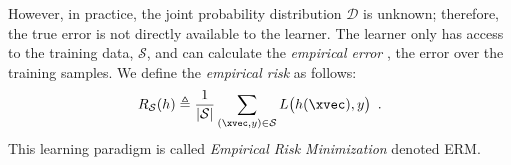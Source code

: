 However, in practice, the joint probability distribution $\mathcal{D}$ is unknown; therefore, the true error is not directly available to the learner.
The learner only has access to the training data, $\mathcal{S}$, and can calculate the \emph{empirical error} \ie, the error over the training samples.
We define the \emph{empirical risk} as follows:
\begin{equation} \label{equation:ch2-empirical_risk}
  R_{\mathcal{S}}(h) \triangleq \frac{1}{|\mathcal{S}|} \sum_{(\xvec, y) \in \mathcal{S}} L\big( h(\xvec), y \big) \enspace.
\end{equation}
This learning paradigm is called \emph{Empirical Risk Minimization} denoted ERM.





